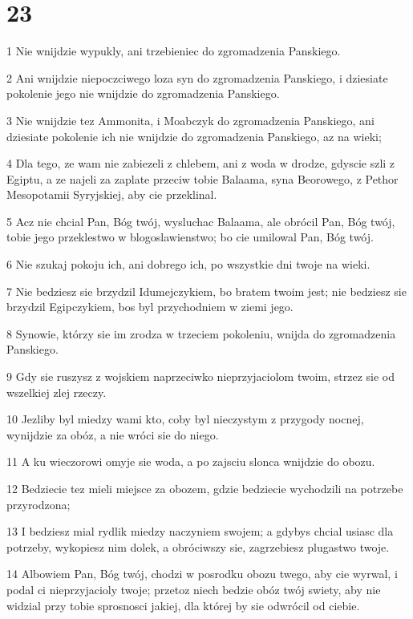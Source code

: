 \chapter{23}

\par 1 Nie wnijdzie wypukly, ani trzebieniec do zgromadzenia Panskiego.
\par 2 Ani wnijdzie niepoczciwego loza syn do zgromadzenia Panskiego, i dziesiate pokolenie jego nie wnijdzie do zgromadzenia Panskiego.
\par 3 Nie wnijdzie tez Ammonita, i Moabczyk do zgromadzenia Panskiego, ani dziesiate pokolenie ich nie wnijdzie do zgromadzenia Panskiego, az na wieki;
\par 4 Dla tego, ze wam nie zabiezeli z chlebem, ani z woda w drodze, gdyscie szli z Egiptu, a ze najeli za zaplate przeciw tobie Balaama, syna Beorowego, z Pethor Mesopotamii Syryjskiej, aby cie przeklinal.
\par 5 Acz nie chcial Pan, Bóg twój, wysluchac Balaama, ale obrócil Pan, Bóg twój, tobie jego przeklestwo w blogoslawienstwo; bo cie umilowal Pan, Bóg twój.
\par 6 Nie szukaj pokoju ich, ani dobrego ich, po wszystkie dni twoje na wieki.
\par 7 Nie bedziesz sie brzydzil Idumejczykiem, bo bratem twoim jest; nie bedziesz sie brzydzil Egipczykiem, bos byl przychodniem w ziemi jego.
\par 8 Synowie, którzy sie im zrodza w trzeciem pokoleniu, wnijda do zgromadzenia Panskiego.
\par 9 Gdy sie ruszysz z wojskiem naprzeciwko nieprzyjaciolom twoim, strzez sie od wszelkiej zlej rzeczy.
\par 10 Jezliby byl miedzy wami kto, coby byl nieczystym z przygody nocnej, wynijdzie za obóz, a nie wróci sie do niego.
\par 11 A ku wieczorowi omyje sie woda, a po zajsciu slonca wnijdzie do obozu.
\par 12 Bedziecie tez mieli miejsce za obozem, gdzie bedziecie wychodzili na potrzebe przyrodzona;
\par 13 I bedziesz mial rydlik miedzy naczyniem swojem; a gdybys chcial usiasc dla potrzeby, wykopiesz nim dolek, a obróciwszy sie, zagrzebiesz plugastwo twoje.
\par 14 Albowiem Pan, Bóg twój, chodzi w posrodku obozu twego, aby cie wyrwal, i podal ci nieprzyjacioly twoje; przetoz niech bedzie obóz twój swiety, aby nie widzial przy tobie sprosnosci jakiej, dla której by sie odwrócil od ciebie.
